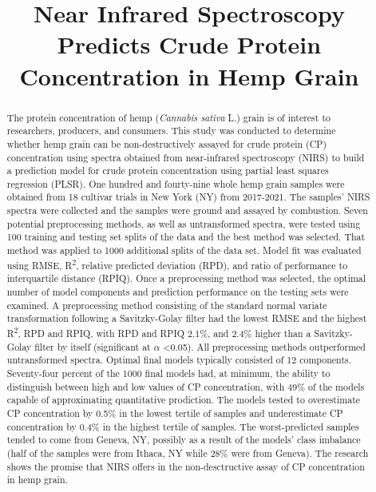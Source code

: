 \documentclass[
]{agujournal2019}
\begin{document}
\title{Near Infrared Spectroscopy Predicts Crude Protein Concentration
in Hemp Grain}



\begin{abstract}
The protein concentration of hemp (\emph{Cannabis sativa} L.) grain is
of interest to researchers, producers, and consumers. This study was
conducted to determine whether hemp grain can be non-destructively
assayed for crude protein (CP) concentration using spectra obtained from
near-infrared spectroscopy (NIRS) to build a prediction model for crude
protein concentration using partial least squares regression (PLSR). One
hundred and fourty-nine whole hemp grain samples were obtained from 18
cultivar trials in New York (NY) from 2017-2021. The samples' NIRS
spectra were collected and the samples were ground and assayed by
combustion. Seven potential preprocessing methods, as well as
untransformed spectra, were tested using 100 training and testing set
splits of the data and the best method was selected. That method was
applied to 1000 additional splits of the data set. Model fit was
evaluated using RMSE, R\textsuperscript{2}, relative predicted deviation
(RPD), and ratio of performance to interquartile distance (RPIQ). Once a
preprocessing method was selected, the optimal number of model
components and prediction performance on the testing sets were examined.
A preprocessing method consisting of the standard normal variate
transformation following a Savitzky-Golay filter had the lowest RMSE and
the highest R\textsuperscript{2}, RPD and RPIQ, with RPD and RPIQ 2.1\%,
and 2.4\% higher than a Savitzky-Golay filter by itself (significant at
\(\alpha\) \textless0.05). All preprocessing methods outperformed
untransformed spectra. Optimal final models typically consisted of 12
components. Seventy-four percent of the 1000 final models had, at
minimum, the ability to distinguish between high and low values of CP
concentration, with 49\% of the models capable of approximating
quantitative prodiction. The models tested to overestimate CP
concentration by 0.5\% in the lowest tertile of samples and
underestimate CP concentration by 0.4\% in the highest tertile of
samples. The worst-predicted samples tended to come from Geneva, NY,
possibly as a result of the models' class imbalance (half of the samples
were from Ithaca, NY while 28\% were from Geneva). The research shows
the promise that NIRS offers in the non-desctructive assay of CP
concentration in hemp grain.
\end{abstract}
\end{document}
